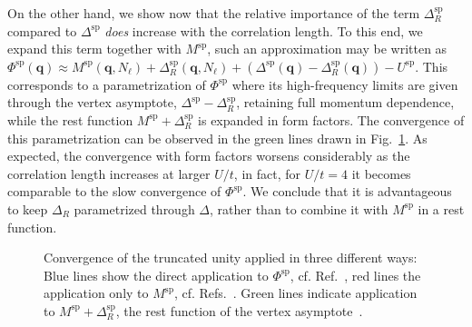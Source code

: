 \documentclass[epj]{svjour}
\newcommand{\qv}{\ensuremath{\mathbf{q}}}
\newcommand{\sz}{\ensuremath{\text{sp}}}
\begin{document}
On the other hand, we show now that the relative importance of the term $\Delta_R^\sz$ compared to $\Delta^\sz$
{\sl does} increase with the correlation length.
To this end, we expand this term together with $M^\sz$,
such an approximation may be written as
$\Phi^\sz(\qv)\approx M^\sz(\qv,N_\ell)+\Delta_R^\sz(\qv,N_\ell)+(\Delta^\sz(\qv)-\Delta^\sz_R(\qv))-U^\sz$.
This corresponds to a parametrization of $\Phi^\sz$ where its high-frequency limits are given
through the vertex asymptote, $\Delta^\sz-\Delta^\sz_R$, retaining full momentum dependence,
while the rest function $M^\sz+\Delta_R^\sz$ is expanded in form factors.
The convergence of this parametrization can be observed in the green lines drawn in Fig.~\ref{fig:ff}.
As expected, the convergence with form factors worsens considerably as the correlation length increases
at larger $U/t$, in fact, for $U/t=4$ it becomes comparable to the slow convergence of $\Phi^\sz$.
We conclude that it is advantageous to keep $\Delta_R$ parametrized through $\Delta$,
rather than to combine it with $M^\sz$ in a rest function.

\begin{figure}
  \begin{center}
\end{center}
    \caption{\label{fig:ff} Convergence of the truncated unity applied in three different ways:
    Blue lines show the direct application to $\Phi^\sz$, cf. Ref.~\cite{Eckhardt20},
    red lines the application only to $M^\sz$, cf. Refs.~\cite{Krien20,Krien20-2}.
    Green lines indicate application to $M^\sz+\Delta^\sz_R$,
    the rest function of the vertex asymptote~\cite{Wentzell20}.
    }
\end{figure}
\end{document}
